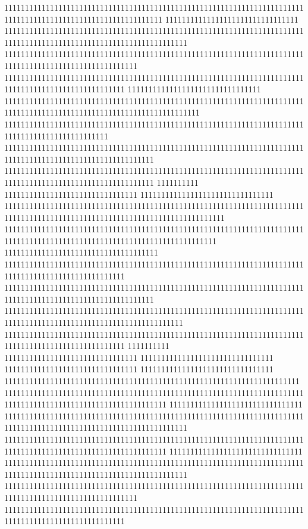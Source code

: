 11111111111111111111111111111111111111111111111111111111111111111111111111111111111111111111111111111111111111
11111111111111111111111111111111
11111111111111111111111111111111111111111111111111111111111111111111111111111111111111111111111111111111111111111111
11111111111111111111111111111111111111111111111111111111111111111111111111111111111111111111111111111111
11111111111111111111111111111111111111111111111111111111111111111111111111111111111111111111111111111
11111111111111111111111111111111
11111111111111111111111111111111111111111111111111111111111111111111111111111111111111111111111111111111111111111111111
1111111111111111111111111111111111111111111111111111111111111111111111111111111111111111111111111
111111111111111111111111111111111111111111111111111111111111111111111111111111111111111111111111111111111111
111111111111111111111111111111111111111111111111111111111111111111111111111111111111111111111111111111111111
1111111111
11111111111111111111111111111111
11111111111111111111111111111111
11111111111111111111111111111111111111111111111111111111111111111111111111111111111111111111111111111111111111111111111111111
111111111111111111111111111111111111111111111111111111111111111111111111111111111111111111111111111111111111111111111111111
1111111111111111111111111111111111111
11111111111111111111111111111111111111111111111111111111111111111111111111111111111111111111111111111
111111111111111111111111111111111111111111111111111111111111111111111111111111111111111111111111111111111111
1111111111111111111111111111111111111111111111111111111111111111111111111111111111111111111111111111111111111111111
11111111111111111111111111111111111111111111111111111111111111111111111111111111111111111111111111111
1111111111
11111111111111111111111111111111
11111111111111111111111111111111
11111111111111111111111111111111
11111111111111111111111111111111
11111111111111111111111111111111111111111111111111111111111111111111111
111111111111111111111111111111111111111111111111111111111111111111111111111111111111111111111111111111111111111
11111111111111111111111111111111
11111111111111111111111111111111111111111111111111111111111111111111111111111111111111111111111111111111111111111111
111111111111111111111111111111111111111111111111111111111111111111111111111111111111111111111111111111111111111
11111111111111111111111111111111
11111111111111111111111111111111111111111111111111111111111111111111111111111111111111111111111111111111111111111111
11111111111111111111111111111111111111111111111111111111111111111111111111111111111111111111111111111111
11111111111111111111111111111111111111111111111111111111111111111111111111111111111111111111111111111
